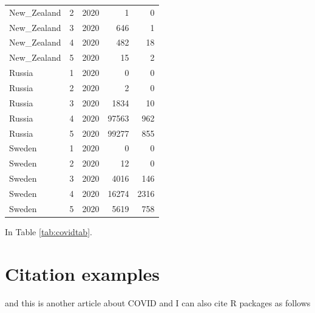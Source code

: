 \documentclass[11pt,a4paper,]{article}
\begin{document}
\begin{table}[!h]
\begin{tabular}[t]{lrrrr}
\rowcolor{gray!6}  New\_Zealand & 2 & 2020 & 1 & 0\\
New\_Zealand & 3 & 2020 & 646 & 1\\
\rowcolor{gray!6}  New\_Zealand & 4 & 2020 & 482 & 18\\
New\_Zealand & 5 & 2020 & 15 & 2\\
\addlinespace
\rowcolor{gray!6}  Russia & 1 & 2020 & 0 & 0\\
Russia & 2 & 2020 & 2 & 0\\
\rowcolor{gray!6}  Russia & 3 & 2020 & 1834 & 10\\
Russia & 4 & 2020 & 97563 & 962\\
\rowcolor{gray!6}  Russia & 5 & 2020 & 99277 & 855\\
\addlinespace
Sweden & 1 & 2020 & 0 & 0\\
\rowcolor{gray!6}  Sweden & 2 & 2020 & 12 & 0\\
Sweden & 3 & 2020 & 4016 & 146\\
\rowcolor{gray!6}  Sweden & 4 & 2020 & 16274 & 2316\\
Sweden & 5 & 2020 & 5619 & 758\\
\bottomrule
\end{tabular}
\end{table}

In Table \ref{tab:covidtab}.

\clearpage

\hypertarget{citation-examples}{%
\section{Citation examples}\label{citation-examples}}

\textcite{BC64} and this is another article about COVID \textcite{bai2020presumed} and I can also cite R packages as follows \textcite{ggplot2}

\printbibliography
\end{document}
